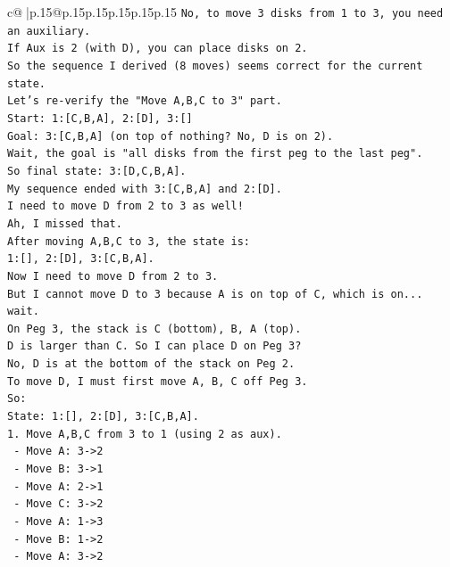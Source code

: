 \documentclass{article}
\begin{document}
{\begin{supertabular}{c@{$\;$}|p{.15\linewidth}@{}p{.15\linewidth}p{.15\linewidth}p{.15\linewidth}p{.15\linewidth}p{.15\linewidth}}
{{{\texttt{No, to move 3 disks from 1 to 3, you need an auxiliary.} \\
\texttt{If Aux is 2 (with D), you can place disks on 2.} \\
\texttt{So the sequence I derived (8 moves) seems correct for the current state.} \\
\texttt{Let's re{-}verify the "Move A,B,C to 3" part.} \\
\texttt{Start: 1:{[}C,B,A{]}, 2:{[}D{]}, 3:{[}{]}} \\
\texttt{Goal: 3:{[}C,B,A{]} (on top of nothing? No, D is on 2).} \\
\texttt{Wait, the goal is "all disks from the first peg to the last peg".} \\
\texttt{So final state: 3:{[}D,C,B,A{]}.} \\
\texttt{My sequence ended with 3:{[}C,B,A{]} and 2:{[}D{]}.} \\
\texttt{I need to move D from 2 to 3 as well!} \\
\texttt{Ah, I missed that.} \\
\texttt{After moving A,B,C to 3, the state is:} \\
\texttt{1:{[}{]}, 2:{[}D{]}, 3:{[}C,B,A{]}.} \\
\texttt{Now I need to move D from 2 to 3.} \\
\texttt{But I cannot move D to 3 because A is on top of C, which is on... wait.} \\
\texttt{On Peg 3, the stack is C (bottom), B, A (top).} \\
\texttt{D is larger than C. So I can place D on Peg 3?} \\
\texttt{No, D is at the bottom of the stack on Peg 2.} \\
\texttt{To move D, I must first move A, B, C off Peg 3.} \\
\texttt{So:} \\
\texttt{State: 1:{[}{]}, 2:{[}D{]}, 3:{[}C,B,A{]}.} \\
\texttt{1. Move A,B,C from 3 to 1 (using 2 as aux).} \\
\texttt{   {-} Move A: 3{-}>2} \\
\texttt{   {-} Move B: 3{-}>1} \\
\texttt{   {-} Move A: 2{-}>1} \\
\texttt{   {-} Move C: 3{-}>2} \\
\texttt{   {-} Move A: 1{-}>3} \\
\texttt{   {-} Move B: 1{-}>2} \\
\texttt{   {-} Move A: 3{-}>2} \\
}}}
\end{supertabular}}
\end{document}
